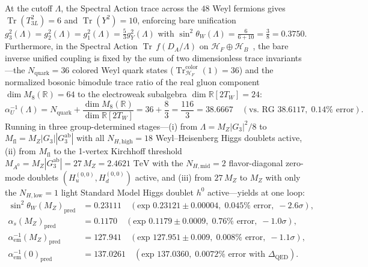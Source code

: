 \documentclass[11pt,a4paper]{article}
\theoremstyle{definition}
\theoremstyle{remark}
\newcommand{\R}{\mathbb{R}}
\newcommand{\Tr}{\operatorname{Tr}}
\newcommand{\Gthree}{G_3}
\begin{document}
At the cutoff $\Lambda$, the Spectral Action trace across the $48$ Weyl fermions gives $\Tr(T_{3L}^2) = 6$ and $\Tr(Y^2) = 10$, enforcing bare unification $g_3^2(\Lambda) = g_2^2(\Lambda) = g_1^2(\Lambda) = \frac{5}{3}g_Y^2(\Lambda)$ with $\sin^2\theta_W(\Lambda) = \frac{6}{6+10} = \frac{3}{8} = 0.3750$. Furthermore, in the Spectral Action $\Tr\,f(D_A/\Lambda)$ on $\mathcal{H}_F \oplus \mathcal{H}_B$~\cite{ChamseddineConnes1997}, the bare inverse unified coupling is fixed by the sum of two dimensionless trace invariants---the $N_{\mathrm{quark}} = 36$ colored Weyl quark states ($\Tr_{\mathcal{H}_F}^{\mathrm{color}}(1) = 36$) and the normalized bosonic bimodule trace ratio of the real gluon component $\dim M_8(\R) = 64$ to the electroweak subalgebra $\dim\R[2T_W] = 24$:
\begin{equation}
\label{eq:bare_alpha_u}
\alpha_U^{-1}(\Lambda) = N_{\mathrm{quark}} + \frac{\dim M_8(\R)}{\dim\R[2T_W]} = 36 + \frac{8}{3} = \frac{116}{3} = 38.6667 \quad (\text{vs.\ RG } 38.6117,\; 0.14\%\text{ error}).
\end{equation}
Running in three group-determined stages---(i) from $\Lambda = M_Z |\Gthree|^2 / 8$ to $M_{\mathrm{fl}} = M_Z |\Gthree| |\Gthree^{\mathrm{ab}}|$ with all $N_{H,\mathrm{high}} = 18$ Weyl--Heisenberg Higgs doublets active, (ii) from $M_{\mathrm{fl}}$ to the 1-vertex Kirchhoff threshold $M_{A^0} = M_Z |\Gthree^{\mathrm{ab}}| = 27\,M_Z = 2.4621\text{ TeV}$ with the $N_{H,\mathrm{mid}} = 2$ flavor-diagonal zero-mode doublets $(H_u^{(0,0)}, H_d^{(0,0)})$ active, and (iii) from $27\,M_Z$ to $M_Z$ with only the $N_{H,\mathrm{low}} = 1$ light Standard Model Higgs doublet $h^0$ active---yields at one loop:
\begin{equation}
\begin{aligned}
\sin^2\theta_W(M_Z)_{\mathrm{pred}} &= 0.23111 \quad (\text{exp } 0.23121 \pm 0.00004,\; 0.045\%\text{ error},\; -2.6\sigma), \\
\alpha_s(M_Z)_{\mathrm{pred}} &= 0.1170 \quad (\text{exp } 0.1179 \pm 0.0009,\; 0.76\%\text{ error},\; -1.0\sigma), \\
\alpha_{\mathrm{em}}^{-1}(M_Z)_{\mathrm{pred}} &= 127.941 \quad (\text{exp } 127.951 \pm 0.009,\; 0.008\%\text{ error},\; -1.1\sigma), \\
\alpha_{\mathrm{em}}^{-1}(0)_{\mathrm{pred}} &= 137.0261 \quad (\text{exp } 137.0360,\; 0.0072\%\text{ error with }\Delta_{\mathrm{QED}}).
\end{aligned}
\end{equation}
\end{document}
